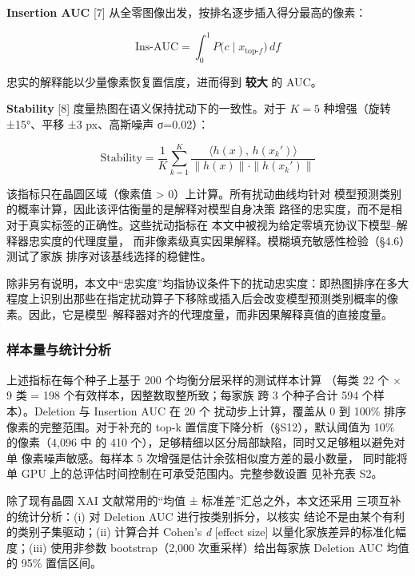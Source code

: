 \documentclass[11pt,a4paper]{article}
\begin{document}
\textbf{Insertion AUC} [7] 从全零图像出发，按排名逐步插入得分最高的像素：

\begin{equation}
\text{Ins-AUC} = \int_0^1 P\bigl(c \mid x_{\text{top-}f}\bigr)\, df
\tag{14}
\end{equation}

忠实的解释能以少量像素恢复置信度，进而得到 \textbf{较大} 的 AUC。

\textbf{Stability} [8] 度量热图在语义保持扰动下的一致性。对于 $K{=}5$ 种增强（旋转 ±15°、平移 ±3 px、高斯噪声 σ=0.02）：

\begin{equation}
\text{Stability} = \frac{1}{K}\sum_{k=1}^K \frac{\langle h(x),\, h(x_k')\rangle}{\|h(x)\| \cdot \|h(x_k')\|}
\tag{15}
\end{equation}

该指标只在晶圆区域（像素值 > 0）上计算。所有扰动曲线均针对 模型预测类别的概率计算，因此该评估衡量的是解释对模型自身决策 路径的忠实度，而不是相对于真实标签的正确性。这些扰动指标在 本文中被视为给定零填充协议下模型–解释器忠实度的代理度量， 而非像素级真实因果解释。模糊填充敏感性检验（§4.6）测试了家族 排序对该基线选择的稳健性。

除非另有说明，本文中“忠实度”均指协议条件下的扰动忠实度：即热图排序在多大程度上识别出那些在指定扰动算子下移除或插入后会改变模型预测类别概率的像素。因此，它是模型–解释器对齐的代理度量，而非因果解释真值的直接度量。

\subsubsection{样本量与统计分析}

上述指标在每个种子上基于 200 个均衡分层采样的测试样本计算 （每类 22 个 × 9 类 = 198 个有效样本，因整数取整所致；每家族 跨 3 个种子合计 594 个样本）。Deletion 与 Insertion AUC 在 20 个 扰动步上计算，覆盖从 0 到 100\% 排序像素的完整范围。对于补充的 top-k 置信度下降分析（§S12），默认阈值为 10\% 的像素（4,096 中 的 410 个），足够精细以区分局部缺陷，同时又足够粗以避免对单 像素噪声敏感。每样本 5 次增强是估计余弦相似度方差的最小数量， 同时能将单 GPU 上的总评估时间控制在可承受范围内。完整参数设置 见补充表 S2。

除了现有晶圆 XAI 文献常用的“均值 ± 标准差”汇总之外，本文还采用 三项互补的统计分析：(i) 对 Deletion AUC 进行按类别拆分，以核实 结论不是由某个有利的类别子集驱动；(ii) 计算合并 Cohen's \emph{d} [effect size] 以量化家族差异的标准化幅度；(iii) 使用非参数 bootstrap（2,000 次重采样）给出每家族 Deletion AUC 均值的 95\% 置信区间。
\end{document}

